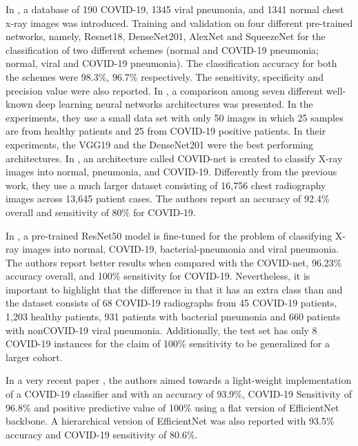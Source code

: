 In \cite{chowdhury2020can}, a database  of 190 COVID-19, 1345 viral pneumonia, and 1341 normal chest x-ray images was introduced. Training and validation on four different pre-trained networks, namely, Resnet18, DenseNet201, AlexNet and SqueezeNet for the classification of two different schemes (normal and COVID-19 pneumonia; normal, viral and COVID-19 pneumonia). The classification accuracy for both the schemes were 98.3\%, 96.7\% respectively. The sensitivity, specificity and precision value were also reported. In \cite{hemdan2020covidx}, a comparison among seven different well-known deep learning neural networks architectures was presented. In the experiments, they use a small data set with only 50 images in which 25 samples are from healthy patients and 25 from COVID-19 positive patients. In their experiments, the VGG19 and the DenseNet201 were the best performing architectures. In \cite{wang2020covid}, an architecture called COVID-net is created to classify X-ray images into normal, pneumonia, and COVID-19. Differently from the previous work, they use a much larger dataset consisting of 16,756 chest radiography images across 13,645 patient cases. The authors report an accuracy of 92.4\% overall and sensitivity of 80\% for COVID-19.
 
In \cite{farooq2020covid}, a pre-trained ResNet50 model is fine-tuned for the problem of classifying X-ray images into normal, COVID-19, bacterial-pneumonia and viral pneumonia. The authors report better results when compared with the COVID-net, 96.23\% accuracy overall, and 100\% sensitivity for COVID-19. Nevertheless, it is important to highlight that the difference in \cite{farooq2020covid} that it has an extra class than \cite{wang2020covid} and the dataset consists of 68 COVID-19 radiographs from 45 COVID-19 patients, 1,203 healthy patients, 931 patients with bacterial pneumonia and 660 patients with nonCOVID-19 viral pneumonia. Additionally, the test set has only 8 COVID-19 instances for the claim of 100\% sensitivity to be generalized for a larger cohort.    
 
 In a very recent paper \cite{luz2020efficient}, the authors aimed towards a light-weight implementation of a COVID-19 classifier and with an accuracy of 93.9\%, COVID-19 Sensitivity of 96.8\% and positive
predictive value of 100\%  using a flat version of EfficientNet backbone. A hierarchical version of EfficientNet was also reported with 93.5\% accuracy and COVID-19 sensitivity of 80.6\%. 



